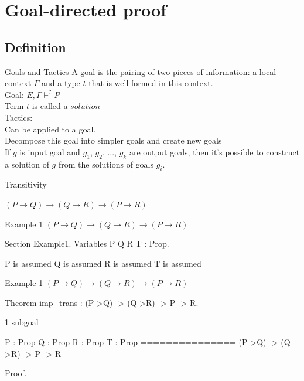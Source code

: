\section{Goal-directed proof}

\subsection{Definition}
\begin{frame}{Goals and Tactics}
	A goal is the pairing of two pieces of information: a local context $\Gamma$ and a type $t$ that is well-formed in this context.\\
	\medskip
	\pause
	Goal: $E, \Gamma \vdash^? P$\\
	\pause
	Term $t$ is called a $solution$\\
	\pause
	\bigskip
	Tactics:\\
	Can be applied to a goal.\\
	Decompose this goal into simpler goals and create new goals\\
	\pause
	\medskip
	If $g$ is input goal and $g_1$, $g_2$, ..., $g_k$ are output goals, then it's possible to construct a solution of $g$ from the solutions of goals $g_i$.
\end{frame}
\begin{frame}{Transitivity}
	\begin{center}
		$(P \rightarrow Q) \rightarrow (Q \rightarrow R) \rightarrow (P \rightarrow R)$
	\end{center}
\end{frame}
\begin{frame}[fragile]{Example 1}
	$(P \rightarrow Q) \rightarrow (Q \rightarrow R) \rightarrow (P \rightarrow R)$
	\pause
	\begin{user}
		Section Example1.
		Variables P Q R T : Prop.
	\end{user}
	\pause
	\begin{coq}
		P is assumed
		Q is assumed
		R is assumed
		T is assumed
	\end{coq}
\end{frame}
\begin{frame}[fragile]{Example 1}
	$(P \rightarrow Q) \rightarrow (Q \rightarrow R) \rightarrow (P \rightarrow R)$
	\pause
	\begin{user}
		Theorem imp_trans : (P->Q) -> (Q->R) -> P -> R.
	\end{user}
	\pause
	\begin{coq}
		1 subgoal

		P : Prop
		Q : Prop
		R : Prop
		T : Prop
		===============
		 (P->Q) -> (Q->R) -> P -> R
	\end{coq}
	\pause
	\begin{user}
		Proof.
	\end{user}
\end{frame}

